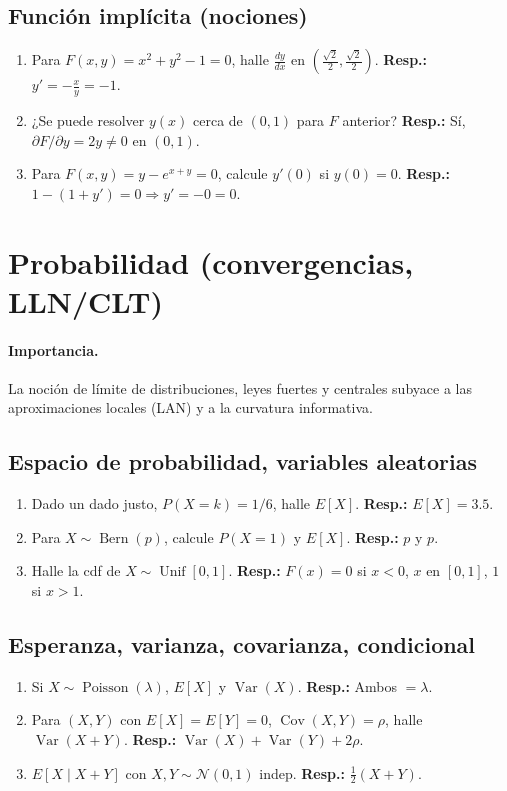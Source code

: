 	\subsection*{Función implícita (nociones)}
	\begin{enumerate}
		\item Para $F(x,y)=x^2+y^2-1=0$, halle $\frac{dy}{dx}$ en $(\tfrac{\sqrt2}{2},\tfrac{\sqrt2}{2})$. \textbf{Resp.:} $y'=-\tfrac{x}{y}=-1$.
		\item ¿Se puede resolver $y(x)$ cerca de $(0,1)$ para $F$ anterior? \textbf{Resp.:} Sí, $\partial F/\partial y=2y\ne0$ en $(0,1)$.
		\item Para $F(x,y)=y-e^{x+y}=0$, calcule $y'(0)$ si $y(0)=0$. \textbf{Resp.:} $1-(1+y')=0\Rightarrow y'=-0=0$.
	\end{enumerate}
	
	\section{Probabilidad (convergencias, LLN/CLT)}
	\paragraph{Importancia.} La noción de límite de distribuciones, leyes fuertes y centrales subyace a las aproximaciones locales (LAN) y a la curvatura informativa.
	
	\subsection*{Espacio de probabilidad, variables aleatorias}
	\begin{enumerate}
		\item Dado un dado justo, $P(X=k)=1/6$, halle $E[X]$. \textbf{Resp.:} $E[X]=3.5$.
		\item Para $X\sim \operatorname{Bern}(p)$, calcule $P(X=1)$ y $E[X]$. \textbf{Resp.:} $p$ y $p$.
		\item Halle la cdf de $X\sim\operatorname{Unif}[0,1]$. \textbf{Resp.:} $F(x)=0$ si $x<0$, $x$ en $[0,1]$, $1$ si $x>1$.
	\end{enumerate}
	
	\subsection*{Esperanza, varianza, covarianza, condicional}
	\begin{enumerate}
		\item Si $X\sim\operatorname{Poisson}(\lambda)$, $E[X]$ y $\operatorname{Var}(X)$. \textbf{Resp.:} Ambos $=\lambda$.
		\item Para $(X,Y)$ con $E[X]=E[Y]=0$, $\operatorname{Cov}(X,Y)=\rho$, halle $\operatorname{Var}(X+Y)$. \textbf{Resp.:} $\operatorname{Var}(X)+\operatorname{Var}(Y)+2\rho$.
		\item $E[X\mid X+Y]$ con $X,Y\sim\mathcal N(0,1)$ indep. \textbf{Resp.:} $\tfrac12(X+Y)$.
	\end{enumerate}
	
